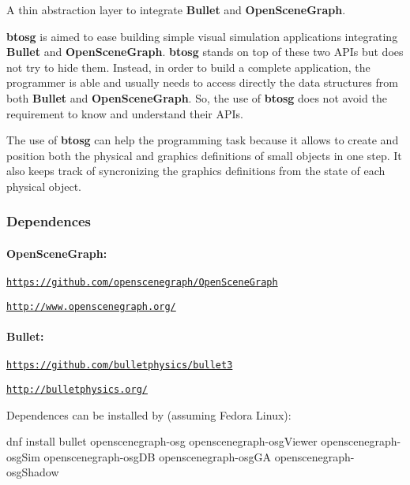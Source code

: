 A thin abstraction layer to integrate {\bfseries Bullet} and {\bfseries Open\+Scene\+Graph}.

{\bfseries btosg} is aimed to ease building simple visual simulation applications integrating {\bfseries Bullet} and {\bfseries Open\+Scene\+Graph}. {\bfseries btosg} stands on top of these two A\+P\+Is but does not try to hide them. Instead, in order to build a complete application, the programmer is able and usually needs to access directly the data structures from both {\bfseries Bullet} and {\bfseries Open\+Scene\+Graph}. So, the use of {\bfseries btosg} does not avoid the requirement to know and understand their A\+P\+Is.

The use of {\bfseries btosg} can help the programming task because it allows to create and position both the physical and graphics definitions of small objects in one step. It also keeps track of syncronizing the graphics definitions from the state of each physical object.

\subsubsection*{Dependences}

\paragraph*{Open\+Scene\+Graph\+:}


\begin{DoxyItemize}
\item \href{https://github.com/openscenegraph/OpenSceneGraph}{\tt https\+://github.\+com/openscenegraph/\+Open\+Scene\+Graph}
\item \href{http://www.openscenegraph.org/}{\tt http\+://www.\+openscenegraph.\+org/} \paragraph*{Bullet\+:}
\end{DoxyItemize}


\begin{DoxyItemize}
\item \href{https://github.com/bulletphysics/bullet3}{\tt https\+://github.\+com/bulletphysics/bullet3}
\item \href{http://bulletphysics.org/}{\tt http\+://bulletphysics.\+org/}
\end{DoxyItemize}

Dependences can be installed by (assuming Fedora Linux)\+: \begin{DoxyVerb}dnf install bullet openscenegraph-osg openscenegraph-osgViewer openscenegraph-osgSim openscenegraph-osgDB openscenegraph-osgGA openscenegraph-osgShadow
\end{DoxyVerb}


